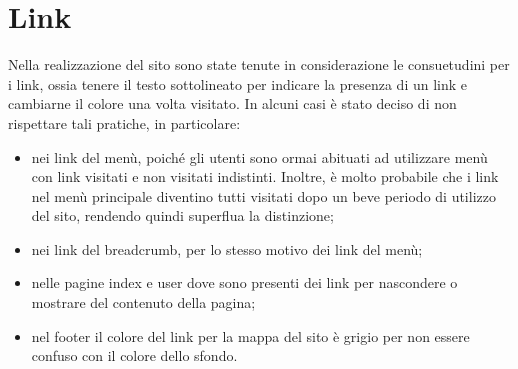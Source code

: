\section{Link}
Nella realizzazione del sito sono state tenute in considerazione le consuetudini per i link, ossia tenere il testo sottolineato per indicare la presenza di un link e cambiarne il colore una volta visitato. In alcuni casi è stato deciso di non rispettare tali pratiche, in particolare:
\begin{itemize}
	\item nei link del menù, poiché gli utenti sono ormai abituati ad utilizzare menù con link visitati e non visitati indistinti. Inoltre, è molto probabile che i link nel menù principale diventino tutti visitati dopo un beve periodo di utilizzo del sito, rendendo quindi superflua la distinzione;
	\item nei link del breadcrumb, per lo stesso motivo dei link del menù;
	\item nelle pagine index e user dove sono presenti dei link per nascondere o mostrare del contenuto della pagina;
	\item nel footer il colore del link per la mappa del sito è grigio per non essere confuso con il colore dello sfondo.
\end{itemize}
